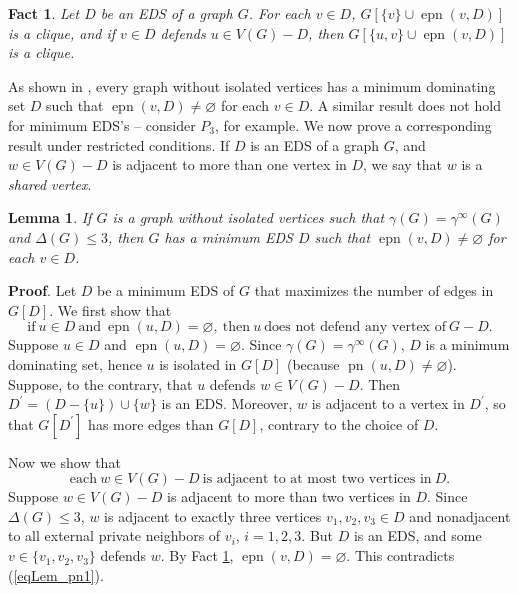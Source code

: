 \documentclass[12pt]{article}%
\newtheorem{Fact}[theorem]{Fact}
\newtheorem{lemma}[theorem]{Lemma}
\begin{document}
\begin{Fact}
\label{FactEDS}Let $D$ be an EDS of a graph $G$. For each $v\in D$,
$G[\{v\}\cup\operatorname{epn}(v,D)]$ is a clique, and if $v\in D$ defends
$u\in V(G)-D$, then $G[\{u,v\}\cup\operatorname{epn}(v,D)]$ is a clique.
\end{Fact}

As shown in \cite{BC}, every graph without isolated vertices has a minimum
dominating set $D$ such that $\operatorname{epn}(v,D)\neq\varnothing$ for each
$v\in D$. A similar result does not hold for minimum EDS's -- consider $P_{3}%
$, for example. We now prove a corresponding result under restricted
conditions. If $D$ is an EDS of a graph $G$, and $w\in V(G)-D$ is adjacent to
more than one vertex in $D$, we say that $w$ is a \emph{shared vertex}.

\begin{lemma}
\label{Lem_epn}If $G$ is a graph without isolated vertices such that
$\gamma(G)=\gamma^{\infty}(G)$ and $\Delta(G)\leq3$, then $G$ has a minimum
EDS $D$ such that $\operatorname{epn}(v,D)\neq\varnothing$ for each $v\in D$.
\end{lemma}

\noindent\textbf{Proof}.\hspace{0.1in} Let $D$ be a minimum EDS of $G$ that
maximizes the number of edges in $G[D]$. We first show that
\begin{equation}
\text{if}\ u\in D\ \text{and}\ \operatorname{epn}(u,D)=\varnothing
,\ \text{then}\ u\ \text{does\ not\ defend\ any\ vertex\ of}\ G-D.
\label{eqLem_pn1}%
\end{equation}
Suppose $u\in D$ and $\operatorname{epn}(u,D)=\varnothing$. Since
$\gamma(G)=\gamma^{\infty}(G)$, $D$ is a minimum dominating set, hence $u$ is
isolated in $G[D]$ (because $\operatorname{pn}(u,D)\neq\varnothing$). Suppose,
to the contrary, that $u$ defends $w\in V(G)-D$. Then $D^{\prime
}=(D-\{u\})\cup\{w\}$ is an EDS. Moreover, $w$ is adjacent to a vertex in
$D^{\prime}$, so that $G[D^{\prime}]$ has more edges than $G[D]$, contrary to
the choice of $D$.

Now we show that%
\begin{equation}
\text{each}\ w\in V(G)-D\ \text{is adjacent to at most two vertices in}\ D.
\label{eqLem_pn2}%
\end{equation}
Suppose $w\in V(G)-D$ is adjacent to more than two vertices in $D$. Since
$\Delta(G)\leq3$, $w$ is adjacent to exactly three vertices $v_{1},v_{2}%
,v_{3}\in D$ and nonadjacent to all external private neighbors of $v_{i}$,
$i=1,2,3$. But $D$ is an EDS, and some $v\in\{v_{1},v_{2},v_{3}\}$ defends
$w$. By Fact \ref{FactEDS}, $\operatorname{epn}(v,D)=\varnothing$. This
contradicts (\ref{eqLem_pn1}).
\end{document}
